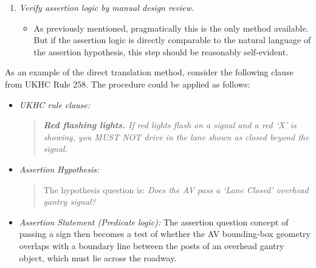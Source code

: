 \begin{enumerate}
    \item \emph{Verify assertion logic by manual design review.} %
    \begin{itemize}
    	\item As previously mentioned, pragmatically this is the only method available. But if the assertion logic is directly comparable to the  natural language of the assertion hypothesis, this step should be reasonably self-evident.
    \end{itemize}
    
\end{enumerate}

As an example of the direct translation method, consider the following clause from UKHC Rule 258. The procedure could be applied as follows:

\begin{itemize}
    \item \emph{UKHC rule clause:}
	    \begin{quote}
			\textit{\textbf{Red flashing lights.} If red lights flash on a signal and a red `X' is showing, you MUST NOT drive in the lane shown as closed beyond the signal.}
		\end{quote}
    \item \emph{Assertion Hypothesis:}
        \begin{quote}
        	The hypothesis question is: \textit{Does the AV pass a `Lane Closed’ overhead gantry signal?}
        \end{quote}
    \item \emph{Assertion Statement (Predicate logic):}
         The assertion question concept of passing a sign then becomes a test of whether the AV bounding-box geometry overlaps with a boundary line between the posts of an overhead gantry object, which must lie across the roadway.
               

\end{itemize}
